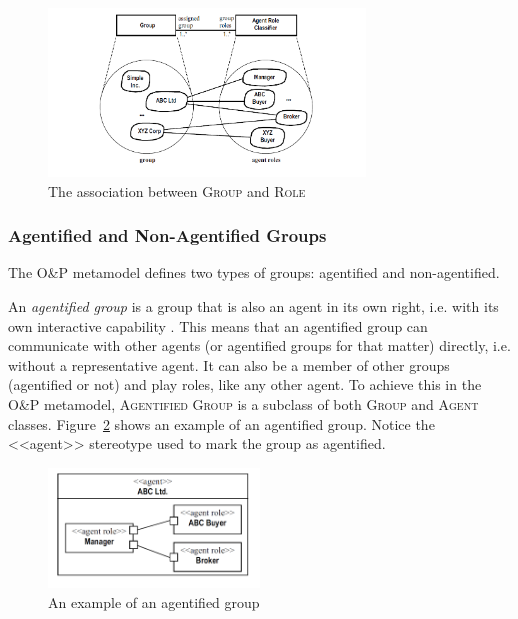 \begin{figure}[h]
	\centering
	\includegraphics[width=0.75\textwidth]{images/onp-group-role-association.png}
	\caption{The association between \textsc{Group} and \textsc{Role}}
	\label{figure:onp-group-role-association}
\end{figure}

\subsubsection*{Agentified and Non-Agentified Groups}

The O\&P metamodel defines two types of groups: agentified and non-agentified.

An \textit{agentified group} is a group that is also an agent in its own right, i.e. with its own interactive capability \cite{Odell05}.
This means that an agentified group can communicate with other agents (or agentified groups for that matter) directly, i.e. without a representative agent.
It can also be a member of other groups (agentified or not) and play roles, like any other agent.
To achieve this in the O\&P metamodel, \textsc{Agentified Group} is a subclass of both \textsc{Group} and \textsc{Agent} classes.
Figure~\ref{figure:onp-agentified-group} shows an example of an agentified group.
Notice the <<agent>> stereotype used to mark the group as agentified.

\begin{figure}[h]
	\centering
	\includegraphics[width=0.5\textwidth]{images/onp-agentified-group.png}
	\caption{An example of an agentified group}
	\label{figure:onp-agentified-group}
\end{figure}

